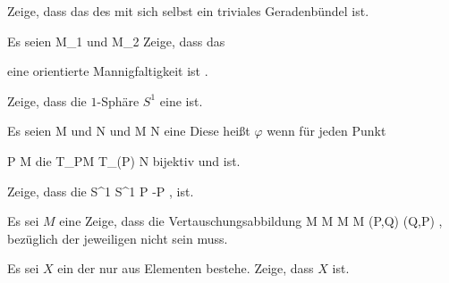 {}
{

Zeige, dass das
des
mit sich selbst ein triviales Geradenbündel ist.

}
{} {}

{}
{

Es seien
\mathkor {} {M_1} {und} {M_2} {}
Zeige, dass das

 eine orientierte Mannigfaltigkeit ist
 {} {.}

}
{} {}

{}
{

Zeige, dass die $1$-Sphäre $S^1$ eine
ist.

}
{} {}

Es seien
\mathkor {} {M} {und} {N} {}
und
\maabbdisp {\varphi} { M } { N
} {}
eine
Diese heißt $\varphi$  wenn für jeden Punkt

\mavergleichskette
{\vergleichskette
{ P
}
{ \in }{ M
}
{  }{
}
{    }{
}
{   }{
}
}
{}{}{}
die
 { T_PM } { T_{\varphi(P)} N
} {}
bijektiv und
ist.

{}
{

Zeige, dass die
\maabbeledisp {\varphi} {S^1} {S^1
} { P } { -P
} {,}
 ist.

}
{} {}

{}
{

Es sei $M$ eine
Zeige, dass die Vertauschungsabbildung
\maabbeledisp {\varphi} {M \times M} {M \times M
} {(P,Q)} {(Q,P)
} {,}
bezüglich der jeweiligen
nicht
sein muss.

}
{} {}

{}
{

Es sei $X$ ein
der nur aus
Elementen bestehe. Zeige, dass $X$
ist.

}
{} {}

